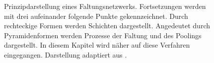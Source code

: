 \begin{figure}[H]
\begin{tikzpicture}
				
			\end{tikzpicture}
			\caption{Prinzipdarstellung eines Faltungsnetzwerks. Fortsetzungen werden mit drei aufeinander folgende Punkte gekennzeichnet. Durch rechteckige Formen werden Schichten dargestellt. Angedeutet durch Pyramidenformen werden Prozesse der Faltung und des Poolings dargestellt. In diesem Kapitel wird näher auf diese Verfahren eingegangen. Darstellung adaptiert aus \cite{carpng,todasc}.}
			\label{fig: depthwise conv }
		\end{figure}
